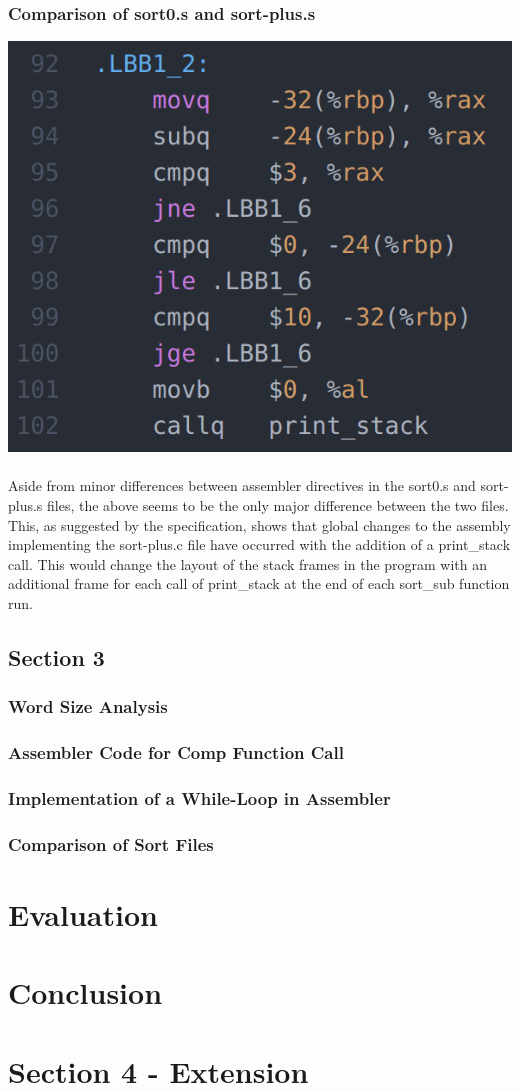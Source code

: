 \documentclass[11]{article}
\begin{document}
			\subsubsection{Comparison of sort0.s and sort-plus.s}
			\includegraphics[scale=0.5]{sort-plus.png} \\\\ Aside from minor differences between assembler directives in the sort0.s and sort-plus.s files, the above seems to be the only major difference between the two files. This, as suggested by the specification, shows that global changes to the assembly implementing the sort-plus.c file have occurred with the addition of a print\_stack call. This would change the layout of the stack frames in the program with an additional frame for each call of print\_stack at the end of each sort\_sub function run.
		\subsection{Section 3}
			\subsubsection{Word Size Analysis}
			\subsubsection{Assembler Code for Comp Function Call}
			\subsubsection{Implementation of a While-Loop in Assembler}
			\subsubsection{Comparison of Sort Files}
	\section{Evaluation}
	\section{Conclusion}
	\section{Section 4 - Extension}
\end{document}
